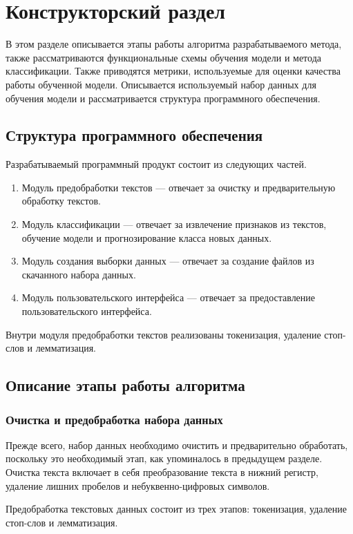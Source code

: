 \chapter{Конструкторский раздел}
В этом разделе описывается этапы работы алгоритма разрабатываемого метода, также рассматриваются функциональные схемы обучения модели и метода классификации. Также приводятся метрики, используемые
для оценки качества работы обученной модели. Описывается используемый набор данных для обучения модели и рассматривается структура программного обеспечения.

\section{Структура программного обеспечения}

Разрабатываемый программный продукт состоит из следующих частей.
\begin{enumerate}
    \item Модуль предобработки текстов --- отвечает за очистку и предварительную обработку текстов.
    \item Модуль классификации --- отвечает за извлечение признаков из текстов, обучение модели и прогнозирование класса новых данных.
    \item Модуль создания выборки данных --- отвечает за создание файлов из скачанного набора данных.
    \item Модуль пользовательского интерфейса --- отвечает за предоставление пользовательского интерфейса.
\end{enumerate}

Внутри модуля предобработки текстов реализованы токенизация, удаление стоп-слов и лемматизация.

\section{Описание этапы работы алгоритма}
\subsection{Очистка и предобработка набора данных}

Прежде всего, набор данных необходимо очистить и предварительно обработать, поскольку это необходимый этап, как упоминалось в предыдущем разделе. Очистка текста включает в себя преобразование текста в нижний регистр, удаление лишних пробелов и небуквенно-цифровых символов.

Предобработка текстовых данных состоит из трех этапов: токенизация, удаление стоп-слов и лемматизация.


